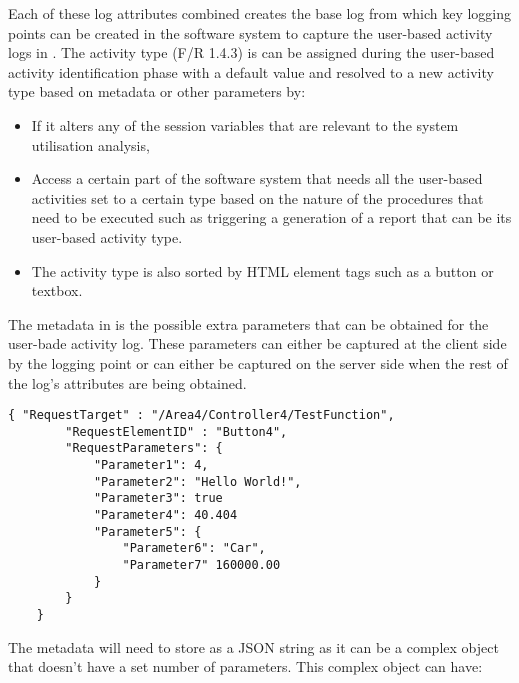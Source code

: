 Each of these log attributes combined creates the base log from which key logging points can be created in the software system to capture the user-based activity logs in . The activity type (F/R 1.4.3) is can be assigned during the user-based activity identification phase with a default value and resolved to a new activity type based on metadata or other parameters by:

\begin{itemize}
	\item If it alters any of the session variables that are relevant to the system utilisation analysis,
	\item Access a certain part of the software system that needs all the user-based activities set to a certain type based on the nature of the procedures that need to be executed such as triggering a generation of a report that can be its user-based activity type.
	\item The activity type is also sorted by HTML element tags such as a button or textbox.
\end{itemize}

The metadata in  is the possible extra parameters that can be obtained for the user-bade activity log. These parameters can either be captured at the client side by the logging point or can either be captured on the server side when the rest of the log's attributes are being obtained.

\begin{lstlisting}[style=json, caption={Metadata JSON}, label={fig:Ch2_Metadata_Json_Example}] 
	{ "RequestTarget" : "/Area4/Controller4/TestFunction",
		"RequestElementID" : "Button4",
		"RequestParameters": {
			"Parameter1": 4,
			"Parameter2": "Hello World!",
			"Parameter3": true
			"Parameter4": 40.404
			"Parameter5": {
				"Parameter6": "Car",
				"Parameter7" 160000.00
			}
		}		
	}
\end{lstlisting}

The metadata will need to store as a JSON string as it can be a complex object that doesn't have a set number of parameters. This complex object can have:

